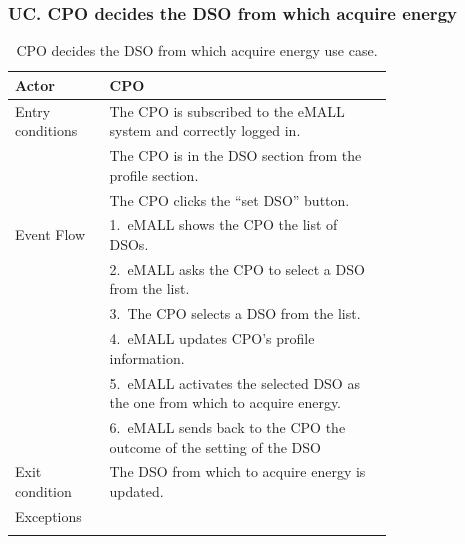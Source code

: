 \subsubsection*{UC\cuc . CPO decides the DSO from which acquire energy}
\begin{center}
    \begin{longtable}{lp{0.75\linewidth}}
        \hline
        Actor            & CPO                                                                           \\
        \hline
        Entry conditions & The CPO is subscribed to the eMALL system and correctly logged in.            \\
        & The CPO is in the DSO section from the profile section.                       \\
        & The CPO clicks the “set DSO” button.                                          \\
        \hline
        Event Flow       & 1.\ eMALL shows the CPO the list of DSOs.                                     \\
        & 2.\ eMALL asks the CPO to select a DSO from the list.                         \\
        & 3.\ The CPO selects a DSO from the list.                                      \\
        & 4.\ eMALL updates CPO’s profile information.                                  \\
        & 5.\ eMALL activates the selected DSO as the one from which to acquire energy. \\
        & 6.\ eMALL sends back to the CPO the outcome of the setting of the DSO         \\
        \hline
        Exit condition   & The DSO from which to acquire energy is updated.                              \\
        \hline
        Exceptions       &                                                                               \\
        \hline
        \caption{CPO decides the DSO from which acquire energy use case.}
        \label{tab: CPO_decides_DSO_use_case}
    \end{longtable}


\end{center}
